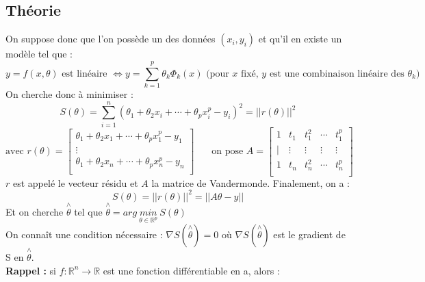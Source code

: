 \documentclass[a4paper,10pt]{report}
\begin{document}
\subsection{Théorie}
On suppose donc que l'on possède un des données $(x_i,y_i)$ et qu'il en existe un modèle tel que :
\abovedisplayskip=0mm
\begin{displaymath}
y=f(x,\theta) \text{ est linéaire } \Leftrightarrow y=\sum \limits^{p}_{k=1} \theta_k\Phi_k(x) \text{ (pour $x$ fixé, $y$ est une combinaison linéaire des $\theta_k$)}
\end{displaymath}
On cherche donc à minimiser :
\abovedisplayskip=0mm
\begin{displaymath}
S(\theta)= \sum \limits^{n}_{i=1} (\theta_1 + \theta_2 x_i + \cdots + \theta_p x_i^p - y_i)^2 = ||r(\theta)||^2
\end{displaymath}
\abovedisplayskip=0mm
\begin{displaymath}
\text{avec } r(\theta) =\left[ \begin{array}{c}
\theta_1 + \theta_2 x_1 + \cdots + \theta_p x_1^p - y_1 \\
\vdots \\
\theta_1 + \theta_2 x_n + \cdots + \theta_p x_n^p - y_n \\
\end{array} \right] \ \ \ \ \ \ \ \ \text{on pose } A = \left[ \begin{array}{ccccc}
1 & t_1 & t_1^2 & \cdots & t_1^p \\
| & \vdots & \vdots & \vdots & \vdots \\
1 & t_n & t_n^2 & \cdots & t_n^p \\
\end{array} \right]
\end{displaymath}
$r$ est appelé le vecteur résidu et $A$ la matrice de Vandermonde.
\newpage
Finalement, on a :
\abovedisplayskip=0mm
\begin{displaymath}
S(\theta)= ||r(\theta)||^2 = ||A\theta - y||
\end{displaymath}
Et on cherche $\overset{\wedge}{\theta}$ tel que $\overset{\wedge}{\theta }=arg \ \underset{\theta \in \mathbb{R}^p}{min} \ S(\theta)$\\
On connaît une condition nécessaire : $\nabla S(\overset{\wedge}{\theta})=0$ où $\nabla S(\overset{\wedge}{\theta})$ est le gradient de S en $\overset{\wedge}{\theta}$. \\
\textbf{Rappel :} si $f:\mathbb{R}^n\rightarrow \mathbb{R}$ est une fonction différentiable en a, alors :\\
\end{document}
